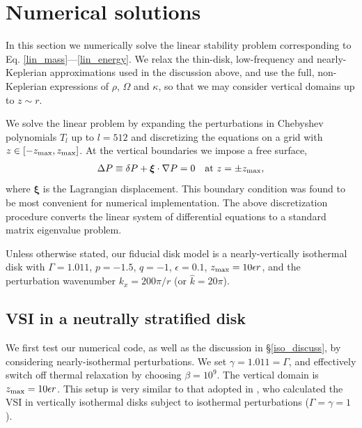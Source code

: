 \section{Numerical solutions}
In this section we numerically solve the linear stability problem
corresponding to Eq. \ref{lin_mass}---\ref{lin_energy}. 
We relax the thin-disk, low-frequency and nearly-Keplerian
approximations used in the discussion above, and 
use the full, non-Keplerian expressions of $\rho$, $\Omega$ and
$\kappa$, so that we may consider vertical domains up to $z\sim r$.  


We solve the linear problem by expanding the
perturbations in Chebyshev polynomials $T_l$ up to $l=512$
and discretizing the equations on a grid with
$z\in[-z_\mathrm{max},z_\mathrm{max}]$. At the vertical boundaries we impose a free
surface, 
\begin{align}
  \Delta P \equiv \delta P + \bm{\xi}\cdot\nabla P= 0 \quad \text{at } z=\pm z_\mathrm{max},
\end{align}
where $\bm{\xi}$ is the Lagrangian displacement. This boundary
condition was found to be most convenient for numerical
implementation. The above discretization procedure converts the linear  
system of differential equations to a standard matrix eigenvalue
problem.     

Unless otherwise stated, our fiducial disk model is a
nearly-vertically isothermal disk with $\Gamma=1.011$, $p=-1.5$,
$q=-1$, $\epsilon=0.1$, $z_\mathrm{max} = 10\epsilon r$, and the perturbation
wavenumber $k_x = 200\pi/r$ (or $\hat{k}=20\pi$). 


\subsection{VSI in a neutrally stratified disk}\label{vertiso_pertiso} 
We first test our numerical code, as well as the discussion in
\S\ref{iso_discuss}, by considering nearly-isothermal
perturbations. We set $\gamma=1.011=\Gamma$, and effectively switch
off thermal relaxation by choosing $\beta=10^9$. The vertical domain is
$z_\mathrm{max} = 10\epsilon r$. This setup is very similar to that adopted in
\cite{mcnally14}, who calculated the VSI in vertically isothermal
disks subject to isothermal perturbations ($\Gamma=\gamma=1$).  


